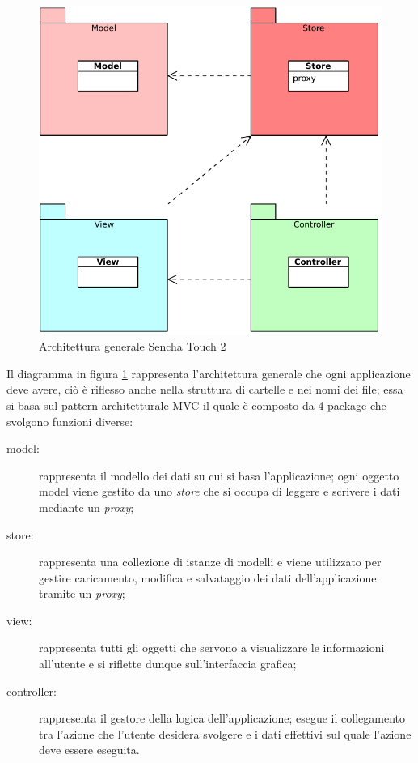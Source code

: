 \begin{figure}[htb]
\centering
\includegraphics[scale=0.6]{gfx/class/Sencha_Touch_2.pdf}
\caption{Architettura generale Sencha Touch 2}
\label{fig:architettura Sencha}
\end{figure}

Il diagramma in figura \ref{fig:architettura Sencha} rappresenta l'architettura generale che ogni applicazione deve avere, ciò è riflesso anche nella struttura di cartelle e nei nomi dei file; essa si basa sul pattern architetturale \ac{MVC} il quale è composto da 4 package che svolgono funzioni diverse:
\begin{description}
\item[model:] rappresenta il modello dei dati su cui si basa l'applicazione; ogni oggetto model viene gestito da uno \emph{store} che si occupa di leggere e scrivere i dati mediante un \emph{proxy};
\item[store:] rappresenta una collezione di istanze di modelli e viene utilizzato per gestire caricamento, modifica e salvataggio dei dati dell'applicazione tramite un \emph{proxy};
\item[view:] rappresenta tutti gli oggetti che servono a visualizzare le informazioni all'utente e si riflette dunque sull'interfaccia grafica;
\item[controller:] rappresenta il gestore della logica dell'applicazione; esegue il collegamento tra l'azione che l'utente desidera svolgere e i dati effettivi sul quale l'azione deve essere eseguita.
\end{description}


